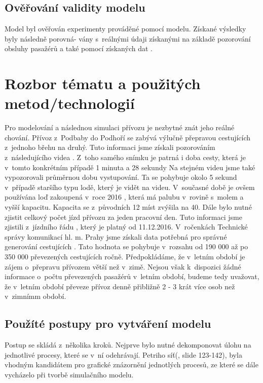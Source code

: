 \documentclass[11pt,a4paper]{article}
\begin{document}
	\subsection{Ověřování validity modelu}
  Model byl ověřován experimenty prováděné pomocí modelu. Získané výsledky byly následně porovná-
  vány s~reálnými údaji získanými na základě pozorování obsluhy pasažérů \cite{DELKA_CESTY} a také pomocí získaných dat \cite{ROCENKY}.

	\section{Rozbor tématu a použitých metod/technologií}
  Pro modelování a následnou simulaci přívozu je nezbytné znát jeho reálné chování.
  Přívoz z~Podbaby do Podhoří se zabývá výlučně přepravou cestujících z~jednoho
  břehu na druhý. Tuto informaci jsme získali pozorováním z~následujícího videa \cite{DELKA_CESTY}.
  Z~toho samého snímku je patrná i doba cesty, která je v~tomto konkrétním případě 1 minuta a 28 sekundy
  Na stejném videu jsme také vypozorovali průměrnou dobu vystupování. Ta se pohybuje
  okolo 5 sekund v~případě staršího typu lodě, který je vidět na videu. V~současné době je ovšem používána loď zakoupená
  v~roce 2016 \cite{LOD}, která má palubu v~rovině s~molem a vyšší kapacitu. Kapacita se z~původních 12 míst zvýšila na
  40. Dále bylo nutné zjistit celkový počet jízd přívozu za jeden pracovní den. Tuto informaci
  jsme zjistili z~jízdního řádu \cite{PID}, který je platný od 11.12.2016.
  V~ročenkách Technické správy komunikací hl. m. Prahy jsme získali data potřebná pro
  správné generování cestujících \cite{ROCENKY}. Tato hodnota se pohybuje v~rozsahu od 190 000
  až po 350 000 převezených cestujících ročně. Předpokládáme, že v~letním období je
  zájem o~přepravu přívozem větší než v~zimě. Nejsou však k~dispozici žádné informace
o~počtu převezených pasažérů v~letním období, budeme tedy uvažovat, že v~letním období
  převeze přívoz denně přibližně 2 - 3 krát více osob než v~zimnímm období.

  \subsection{Použíté postupy pro vytváření modelu}
  Postup se skládá z~několika kroků. Nejprve bylo nutné dekomponovat úlohu na jednotlivé procesy,
  které se v~ní odehrávají. Petriho síť(\cite{SLAJD}, slide 123-142), byla vhodným kandidátem pro grafické znázornění
  jednotlých procesů, ze které se dále vycházelo při tvorbě simulačního modelu.
\end{document}
